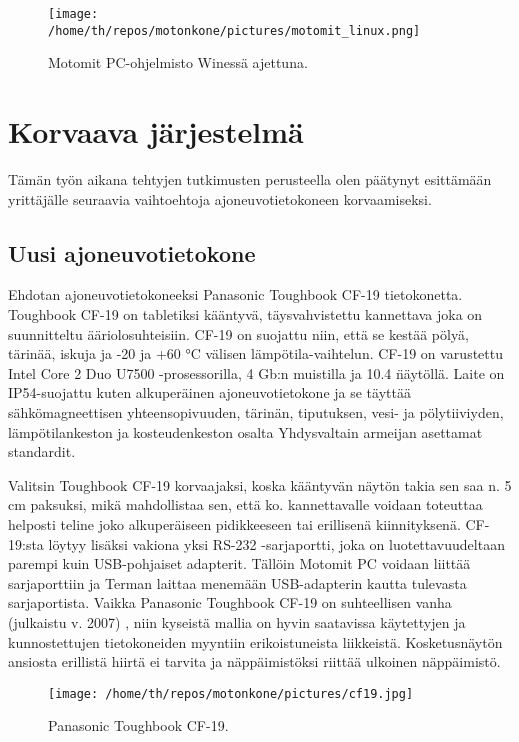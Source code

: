\documentclass[11pt,a4paper,oneside,article]{memoir}
\begin{document}
\begin{figure}[H]
\centering
\texttt{[image: /home/th/repos/motonkone/pictures/motomit\_linux.png]}
\caption{Motomit PC-ohjelmisto Winessä ajettuna.}
\end{figure}

\newpage

\chapter{Korvaava järjestelmä}
\label{ch:korvaava_jarjestelma}

Tämän työn aikana tehtyjen tutkimusten perusteella olen päätynyt esittämään yrittäjälle seuraavia vaihtoehtoja ajoneuvotietokoneen korvaamiseksi.

\section{Uusi ajoneuvotietokone}

Ehdotan ajoneuvotietokoneeksi Panasonic Toughbook CF-19 tietokonetta. Toughbook CF-19 on tabletiksi kääntyvä, täysvahvistettu kannettava joka on suunnitteltu ääriolosuhteisiin. CF-19 on suojattu niin, että se kestää pölyä, tärinää, iskuja ja -20 ja +60 °C välisen lämpötila-vaihtelun. CF-19 on varustettu Intel Core 2 Duo U7500 -prosessorilla, 4 Gb:n muistilla ja 10.4 \" näytöllä. Laite on IP54-suojattu kuten alkuperäinen ajoneuvotietokone ja se täyttää sähkömagneettisen yhteensopivuuden, tärinän, tiputuksen, vesi- ja pölytiiviyden, lämpötilankeston ja kosteudenkeston osalta Yhdysvaltain armeijan asettamat standardit. \cite{cf19}

Valitsin Toughbook CF-19 korvaajaksi, koska kääntyvän näytön takia sen saa n. 5 cm paksuksi, mikä mahdollistaa sen, että ko. kannettavalle voidaan toteuttaa helposti teline joko alkuperäiseen pidikkeeseen tai erillisenä kiinnityksenä. CF-19:sta löytyy lisäksi vakiona yksi RS-232 -sarjaportti, joka on luotettavuudeltaan parempi kuin USB-pohjaiset adapterit. Tällöin Motomit PC voidaan liittää sarjaporttiin ja Terman laittaa menemään USB-adapterin kautta tulevasta sarjaportista. Vaikka Panasonic Toughbook CF-19 on suhteellisen vanha (julkaistu v. 2007) \cite{cf19}, niin kyseistä mallia on hyvin saatavissa käytettyjen ja kunnostettujen tietokoneiden myyntiin erikoistuneista liikkeistä. Kosketusnäytön ansiosta erillistä hiirtä ei tarvita ja näppäimistöksi riittää ulkoinen näppäimistö.

\begin{figure}[H]
\centering
\texttt{[image: /home/th/repos/motonkone/pictures/cf19.jpg]}
\caption{Panasonic Toughbook CF-19.}
\end{figure}
\end{document}

